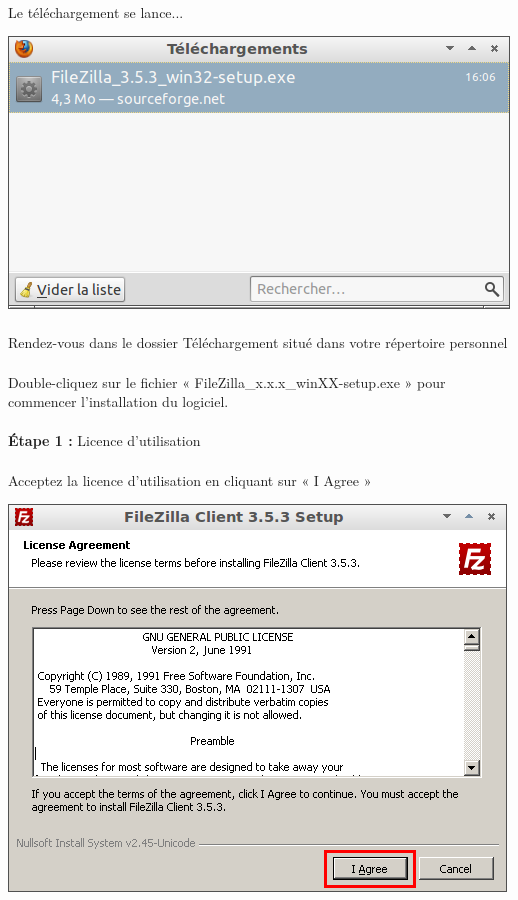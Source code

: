 \documentclass[10pt,a4paper]{article}
\begin{document}
\paragraph{}Le téléchargement se lance...
\begin{center}
\includegraphics[scale=0.5]{img/0015.png}
\end{center}
\paragraph{}Rendez-vous dans le dossier Téléchargement situé dans votre répertoire personnel
\paragraph{}Double-cliquez sur le fichier « FileZilla\_x.x.x\_winXX-setup.exe » pour commencer l'installation du logiciel.
\paragraph{}\textbf{Étape 1 : }Licence d'utilisation
\paragraph{}Acceptez la licence d'utilisation en cliquant sur « I Agree »
\begin{center}
\includegraphics[scale=0.5]{img/0016.png}
\end{center}
\end{document}
